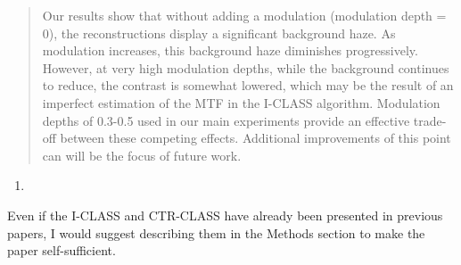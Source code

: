 \documentclass[12pt]{article}
\newcommand{\hlred}[1]{\sethlcolor{red!30}\hl{#1}}
\newenvironment{solved_reviewercomment}
    {\begin{tcolorbox}[width=\linewidth,colback=gray!5,colframe=solved_commentcolor!50,title=Reviewer Comment,left=5pt,right=5pt]}
    {\end{tcolorbox}}
\newenvironment{ourresponse}
    {\begin{tcolorbox}[width=\linewidth,breakable,enhanced,colback=gray!5,colframe=responsecolor!50,title=Response,left=5pt,right=5pt]}
    {\end{tcolorbox}}
\begin{document}
\begin{ourresponse}
\begin{quote}


Our results show that without adding a modulation (modulation depth = 0), the reconstructions display a significant background haze. As modulation increases, this background haze diminishes progressively. However, at very high modulation depths, while the background continues to reduce, the contrast is somewhat lowered, which may be the result of an imperfect estimation of the MTF in the I-CLASS algorithm.  Modulation depths of 0.3-0.5 used in our main experiments provide an effective trade-off between these competing effects. 
Additional improvements of this point can will be the focus of future work.



\end{quote}
\end{ourresponse}


    
\begin{enumerate}[label=\arabic*., resume]
\item \leavevmode
\end{enumerate}
\vspace{-1em}
\begin{solved_reviewercomment}
    Even if the I-CLASS and CTR-CLASS have already been presented in previous papers, I would suggest describing them in the Methods section to make the paper self-sufficient. 
\end{solved_reviewercomment}

\end{document}
